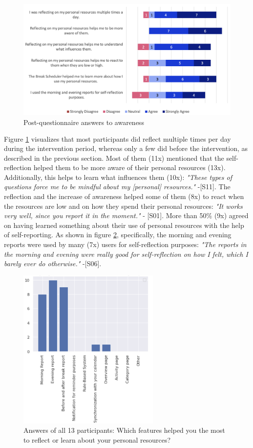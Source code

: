 \documentclass{hasel_thesis}
\begin{document}
\begin{figure}[htp]
    \centering
    \includegraphics[width=12cm]{hasel_thesis/images/agreement_1.png}
    \caption{Post-questionnaire answers to awareness}
    \label{fig:awareness_agreement}
\end{figure}

 Figure \ref{fig:awareness_agreement} visualizes that most participants did reflect multiple times per day during the intervention period, whereas only a few did before the intervention, as described in the previous section. Most of them (11x) mentioned that the self-reflection helped them to be more aware of their personal resources (13x). Additionally, this helps to learn what influences them (10x): \textit{"These types of questions force me to be mindful about my [personal] resources." }-[S11]. The reflection and the increase of awareness helped some of them (8x) to react when the resources are low and on how they spend their personal resources: \textit{"It works very well, since you report it in the moment."} - [S01]. More than 50\% (9x) agreed on having learned something about their use of personal resources with the help of self-reporting. As shown in figure \ref{fig:feature_ratings_reflecting}, specifically, the morning and evening reports were used by many (7x) users for self-reflection purposes: \textit{"The reports in the morning and evening were really good for self-reflection on how I felt, which I barely ever do otherwise."} -[S06]. 

\begin{figure}[htp]
    \centering
    \includegraphics[width=7cm]{hasel_thesis/images/feature_rating_reflecting.png}
    \caption{Answers of all 13 participants: Which features helped you the most to reflect or learn about your personal resources?}
    \label{fig:feature_ratings_reflecting}
\end{figure}
\end{document}

